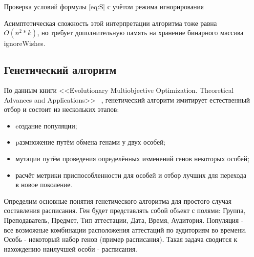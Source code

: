 \begin{algorithm} 
	\nonl{}
	\caption{Проверка условий формулы \eqref{eq:S} с учётом режима игнорирования}\label{alg:algoFindNextPr}
\end{algorithm} 
Асимптотическая сложность этой интерпретации алгоритма тоже равна ${O(n^2 * k)}$, но требует дополнительную память на хранение бинарного массива ignoreWishes. 
\FloatBarrier

\subsection{Генетический алгоритм}
По данным книги <<Evolutionary Multiobjective Optimization. Theoretical Advances and Applications>> ~\cite{gen}, генетический алгоритм имитирует естественный отбор и состоит из нескольких этапов:
\begin{itemize}
	\item cоздание популяции;
	\item pазмножение путём обмена генами у двух особей;
	\item мутации путём проведения определённых изменений генов некоторых особей;
	\item расчёт метрики приспособленности для особей и отбор лучших для перехода в новое поколение.
\end{itemize}

Определим основные понятия генетического алгоритма для простого случая составления расписания. Ген будет представлять собой объект с полями: Группа, Преподаватель, Предмет, Тип аттестации, Дата, Время, Аудитория. Популяция - все возможные комбинации расположения аттестаций по аудиториям во времени. Особь - некоторый набор генов (пример расписания). Такая задача сводится к нахождению наилучшей особи - расписания.

